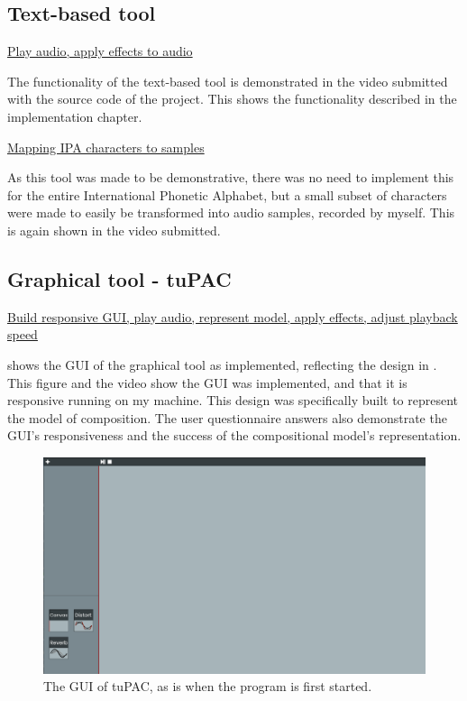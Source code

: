 \documentclass[12pt,a4paper,oneside,openright]{report}
\begin{document}
\subsection{Text-based tool}
\underline{Play audio, apply effects to audio}

The functionality of the text-based tool is demonstrated in the video submitted with the source code of the project. This shows the functionality described in the implementation chapter.

\bigskip
\underline{Mapping IPA characters to samples}

As this tool was made to be demonstrative, there was no need to implement this for the entire International Phonetic Alphabet, but a small subset of characters were made to easily be transformed into audio samples, recorded by myself. This is again shown in the video submitted.

\subsection{Graphical tool - tuPAC}
\underline{Build responsive GUI, play audio, represent model, apply effects, adjust playback speed}

 shows the GUI of the graphical tool as implemented, reflecting the design in . This figure and the video show the GUI was implemented, and that it is responsive running on my machine. This design was specifically built to represent the model of composition. The user questionnaire answers also demonstrate the GUI's responsiveness and the success of the compositional model's representation.

\begin{figure}[h]
    \centering
    \includegraphics[scale=0.3]{images/tuPAC_GUI.png}
    \caption{The GUI of tuPAC, as is when the program is first started.}
    \label{fig:tupac_gui}
\end{figure}
\end{document}
